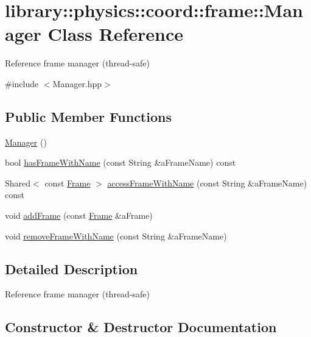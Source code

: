 \hypertarget{classlibrary_1_1physics_1_1coord_1_1frame_1_1_manager}{}\section{library\+:\+:physics\+:\+:coord\+:\+:frame\+:\+:Manager Class Reference}
\label{classlibrary_1_1physics_1_1coord_1_1frame_1_1_manager}


Reference frame manager (thread-\/safe)  




{\ttfamily \#include $<$Manager.\+hpp$>$}

\subsection*{Public Member Functions}
\begin{DoxyCompactItemize}
\item 
\hyperlink{classlibrary_1_1physics_1_1coord_1_1frame_1_1_manager_a5ba1d27be69eed9db6f533b65df96280}{Manager} ()
\item 
bool \hyperlink{classlibrary_1_1physics_1_1coord_1_1frame_1_1_manager_a842f8a8060172178930aed212c4fcf6d}{has\+Frame\+With\+Name} (const String \&a\+Frame\+Name) const
\item 
Shared$<$ const \hyperlink{classlibrary_1_1physics_1_1coord_1_1_frame}{Frame} $>$ \hyperlink{classlibrary_1_1physics_1_1coord_1_1frame_1_1_manager_a13b4885965a111cebff6f04339d81596}{access\+Frame\+With\+Name} (const String \&a\+Frame\+Name) const
\item 
void \hyperlink{classlibrary_1_1physics_1_1coord_1_1frame_1_1_manager_aa4215eb9b956a3b4a2933a33d98b7007}{add\+Frame} (const \hyperlink{classlibrary_1_1physics_1_1coord_1_1_frame}{Frame} \&a\+Frame)
\item 
void \hyperlink{classlibrary_1_1physics_1_1coord_1_1frame_1_1_manager_a63e05e289d34f354dafefbff2b8478af}{remove\+Frame\+With\+Name} (const String \&a\+Frame\+Name)
\end{DoxyCompactItemize}


\subsection{Detailed Description}
Reference frame manager (thread-\/safe) 

\subsection{Constructor \& Destructor Documentation}
\mbox{\label{classlibrary_1_1physics_1_1coord_1_1frame_1_1_manager_a5ba1d27be69eed9db6f533b65df96280}} 
